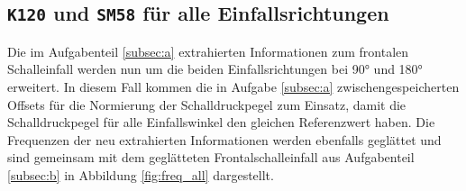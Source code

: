 \subsection{\texttt{K120} und \texttt{SM58} für alle Einfallsrichtungen}
\label{subsec:c}
Die im Aufgabenteil \ref{subsec:a} extrahierten Informationen zum frontalen Schalleinfall werden nun um die beiden Einfallsrichtungen bei 90° und 180° erweitert.
In diesem Fall kommen die in Aufgabe \ref{subsec:a} zwischengespeicherten Offsets für die Normierung der Schalldruckpegel zum Einsatz, damit die Schalldruckpegel für alle Einfallswinkel den gleichen Referenzwert haben.
Die Frequenzen der neu extrahierten Informationen werden ebenfalls geglättet und sind gemeinsam mit dem geglätteten Frontalschalleinfall aus Aufgabenteil \ref{subsec:b} in Abbildung \ref{fig:freq_all} dargestellt.

